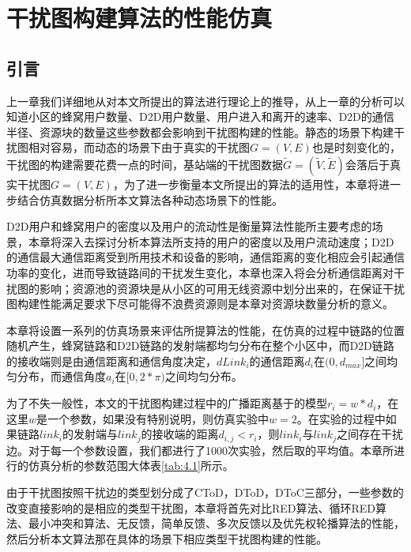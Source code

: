 \documentclass[figurelist,tablelist,algorithmlist,nomlist,masters]{seuthesix}
\begin{document}
	
	
	\chapter{干扰图构建算法的性能仿真}
	\section{引言}
	上一章我们详细地从对本文所提出的算法进行理论上的推导，从上一章的分析可以知道小区的蜂窝用户数量、D2D用户数量、用户进入和离开的速率、D2D的通信半径、资源块的数量这些参数都会影响到干扰图构建的性能。静态的场景下构建干扰图相对容易，而动态的场景下由于真实的干扰图$G = (V,E)$也是时刻变化的，干扰图的构建需要花费一点的时间，基站端的干扰图数据$\tilde G = (\tilde V,\tilde E)$会落后于真实干扰图$G = (V,E)$，为了进一步衡量本文所提出的算法的适用性，本章将进一步结合仿真数据分析所本文算法各种动态场景下的性能。


	D2D用户和蜂窝用户的密度以及用户的流动性是衡量算法性能所主要考虑的场景，本章将深入去探讨分析本算法所支持的用户的密度以及用户流动速度；D2D的通信最大通信距离受到所用技术和设备的影响，通信距离的变化相应会引起通信功率的变化，进而导致链路间的干扰发生变化，本章也深入将会分析通信距离对干扰图的影响；资源池的资源块是从小区的可用无线资源中划分出来的，在保证干扰图构建性能满足要求下尽可能得不浪费资源则是本章对资源块数量分析的意义。


	本章将设置一系列的仿真场景来评估所提算法的性能，在仿真的过程中链路的位置随机产生，蜂窝链路和D2D链路的发射端都均匀分布在整个小区中，而D2D链路的接收端则是由通信距离和通信角度决定，$dLink_i$的通信距离$d_i$在$(0,d_{max}]$之间均匀分布，而通信角度$a_i$在$[0,2*\pi )$之间均匀分布。
	
	为了不失一般性，本文的干扰图构建过程中的广播距离基于的模型$r_i = w * d_i$，在这里$w$是一个参数，如果没有特别说明，则仿真实验中$w = 2$。在实验的过程中如果链路$link_i$的发射端与$link_j$的接收端的距离$d_{i,j} <　r_i$，则$link_i$与$link_j$之间存在干扰边。对于每一个参数设置，我们都进行了1000次实验，然后取的平均值。本章所进行的仿真分析的参数范围大体表\ref{tab:4.1}所示。

	由于干扰图按照干扰边的类型划分成了CToD，DToD，DToC三部分，一些参数的改变直接影响的是相应的类型干扰图，本章将首先对比RED算法、循环RED算法、最小冲突和算法、无反馈，简单反馈、多次反馈以及优先权轮播算法的性能，然后分析本文算法那在具体的场景下相应类型干扰图构建的性能。
\end{document}
